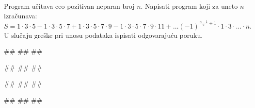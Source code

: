 \begin{Exercise}[difficulty=1, label=p1.7_razno8] 
Program učitava ceo pozitivan neparan broj $n$.  Napisati program koji
za uneto $n$ izračunava:
$$S = 1\cdot3\cdot5 - 1\cdot3\cdot5\cdot7 + 1\cdot3\cdot5\cdot7\cdot9
- 1\cdot3\cdot5\cdot7\cdot9\cdot11 + \ldots
(-1)^{\frac{n-1}{2}+1}\cdot1\cdot3\cdot \ldots \cdot n.$$ U slučaju
greške pri unosu podataka ispisati odgovarajuću poruku. 
  
\begin{miditest}
\begin{upotreba}{1}
#\naslovInt#
##
##
\end{upotreba}
\end{miditest}
\begin{miditest}
\begin{upotreba}{2}
#\naslovInt#
##
##
\end{upotreba}
\end{miditest}

\begin{miditest}
\begin{upotreba}{3}
#\naslovInt#
##
##
\end{upotreba}
\end{miditest}
\begin{miditest}
\begin{upotreba}{4}
#\naslovInt#
##
##
\end{upotreba}
\end{miditest}
\end{Exercise}
\begin{Answer}[ref=p1.7_razno8]
\end{Answer}

